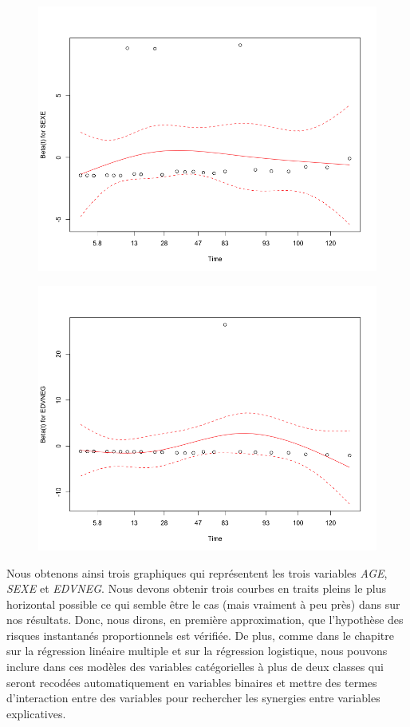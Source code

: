\begin{figure}[H]\begin{center}\includegraphics[scale=0.5]{ilu/dsurv7.png}\end{center}\end{figure}

\begin{figure}[H]\begin{center}\includegraphics[scale=0.5]{ilu/dsurv8.png}\end{center}\end{figure}


Nous obtenons ainsi trois graphiques qui représentent les trois variables \textit{AGE}, \textit{SEXE} et \textit{EDVNEG}. Nous devons obtenir trois courbes en traits pleins le plus horizontal possible ce qui semble être le cas (mais vraiment à peu près) dans sur nos résultats. Donc, nous dirons, en première approximation, que l'hypothèse des risques instantanés proportionnels est vérifiée.\newline 
De plus, comme dans le chapitre sur la régression linéaire multiple et sur la régression logistique, nous pouvons inclure dans ces modèles des variables catégorielles à plus de deux classes qui seront recodées automatiquement en variables binaires et mettre des termes
d'interaction entre des variables pour rechercher les synergies entre variables explicatives.

